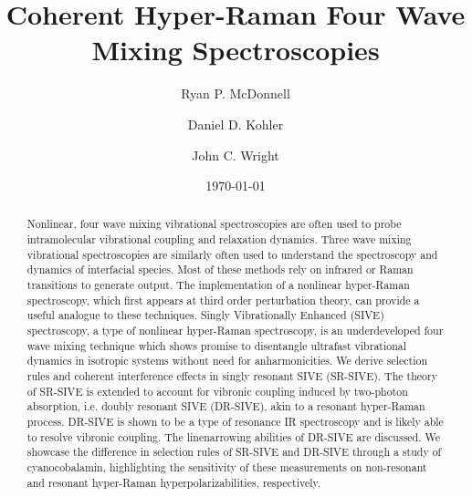 \documentclass[aip, jcp, reprint, twocolumn]{revtex4-2}
\begin{document}
\title{Coherent Hyper-Raman Four Wave Mixing Spectroscopies}

\author{Ryan P. McDonnell} 
\author{Daniel D. Kohler}
\author{John C. Wright} 


\date{\today}

\begin{abstract}
Nonlinear, four wave mixing vibrational spectroscopies are often used to probe intramolecular vibrational coupling and relaxation dynamics.
Three wave mixing vibrational spectroscopies are similarly often used to understand the spectroscopy and dynamics of interfacial species.
Most of these methods rely on infrared or Raman transitions to generate output. 
The implementation of a nonlinear hyper-Raman spectroscopy, which first appears at third order perturbation theory, can provide a useful analogue to these techniques.
Singly Vibrationally Enhanced (SIVE) spectroscopy, a type of nonlinear hyper-Raman spectroscopy, is an underdeveloped four wave mixing technique which shows promise to disentangle ultrafast vibrational dynamics in isotropic systems without need for anharmonicities.
We derive selection rules and coherent interference effects in singly resonant SIVE (SR-SIVE).
The theory of SR-SIVE is extended to account for vibronic coupling induced by two-photon absorption, i.e. doubly resonant SIVE (DR-SIVE), akin to a resonant hyper-Raman process. 
DR-SIVE is shown to be a type of resonance IR spectroscopy and is likely able to resolve vibronic coupling.
The linenarrowing abilities of DR-SIVE are discussed.
We showcase the difference in selection rules of SR-SIVE and DR-SIVE through a study of cyanocobalamin, highlighting the sensitivity of these measurements on non-resonant and resonant hyper-Raman hyperpolarizabilities, respectively.
\end{abstract}

\maketitle
\end{document}
